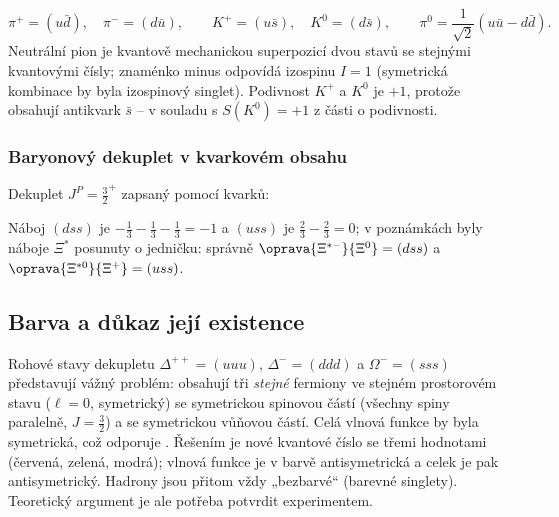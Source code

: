 \[
  \pi^+=(u\bar d),\quad \pi^-=(d\bar u),\qquad
  K^+=(u\bar s),\quad K^0=(d\bar s),\qquad
  \pi^0=\frac{1}{\sqrt2}\left(u\bar u-d\bar d\right).
\]
Neutrální pion je kvantově mechanickou superpozicí dvou stavů se stejnými
kvantovými čísly; znaménko minus odpovídá izospinu \(I=1\) (symetrická
kombinace by byla izospinový singlet). Podivnost \(K^+\) a \(K^0\) je
\(+1\), protože obsahují antikvark \(\bar s\) -- v souladu s \(S(K^0)=+1\)
z části o podivnosti.

\subsubsection*{Baryonový dekuplet v kvarkovém obsahu}
Dekuplet \(J^P=\tfrac32^+\) zapsaný pomocí kvarků:
\begin{center}
\end{center}
Náboj \((dss)\) je \(-\tfrac13-\tfrac13-\tfrac13=-1\) a \((uss)\) je
\(\tfrac23-\tfrac23=0\); v poznámkách byly náboje \(\Xi^*\) posunuty o
jedničku: správně \(\oprava{\Xi^{*-}}{\Xi^0}=(dss)\) a
\(\oprava{\Xi^{*0}}{\Xi^+}=(uss)\).

\subsection{Barva a důkaz její existence}

Rohové stavy dekupletu \(\Delta^{++}=(uuu)\), \(\Delta^-=(ddd)\) a
\(\Omega^-=(sss)\) představují vážný problém: obsahují tři \emph{stejné}
fermiony ve stejném prostorovém stavu (\(\ell=0\), symetrický) se
symetrickou spinovou částí (všechny spiny paralelně, \(J=\tfrac32\)) a se
symetrickou vůňovou částí. Celá vlnová funkce by byla symetrická, což
odporuje . Řešením je nové kvantové číslo
 se třemi hodnotami (červená, zelená, modrá); vlnová funkce je
v barvě antisymetrická a celek je pak antisymetrický. Hadrony jsou přitom
vždy „bezbarvé“ (barevné singlety). Teoretický argument je ale potřeba
potvrdit experimentem.

